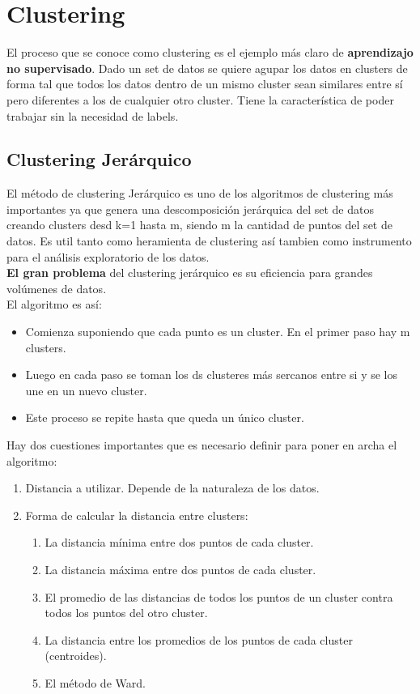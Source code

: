 \documentclass[titlepage,a4paper]{article}
\begin{document}
\section*{Clustering}
El proceso que se conoce como clustering es el ejemplo más claro de \textbf{aprendizajo no supervisado}. Dado un set de datos se quiere agupar los datos en clusters de forma tal que todos los datos dentro de un mismo cluster sean similares entre sí pero diferentes a los de cualquier otro cluster. Tiene la característica de poder trabajar sin la necesidad de labels. 

\subsection*{Clustering Jerárquico}
El método de clustering Jerárquico es uno de los algoritmos de clustering más importantes ya que genera una descomposición jerárquica del set de datos creando clusters desd k=1 hasta m, siendo m la cantidad de puntos del set de datos. Es util tanto como heramienta de clustering así tambien como instrumento para el análisis exploratorio de los datos. \\

\textbf{El gran problema} del clustering jerárquico es su eficiencia para grandes volúmenes de datos. \\

El algoritmo es así: 
\begin{itemize}
\item Comienza suponiendo que cada punto es un cluster. En el primer paso hay m clusters. 
\item Luego en cada paso se toman los ds clusteres más sercanos entre si y se los une en un nuevo cluster. 
\item Este proceso se repite hasta que queda un único cluster. 
\end{itemize}

Hay dos cuestiones importantes que es necesario definir para poner en archa el algoritmo: 
\begin{enumerate}
\item Distancia a utilizar. Depende de la naturaleza de los datos. 
\item Forma de calcular la distancia entre clusters:
\begin{enumerate}
\item La distancia mínima entre dos puntos de cada cluster. 
\item La distancia máxima entre dos puntos de cada cluster.
\item El promedio de las distancias de todos los puntos de un cluster contra todos los puntos del otro cluster. 
\item La distancia entre los promedios de los puntos de cada cluster (centroides). 
\item El método de Ward. 
\end{enumerate}
\end{enumerate}
\end{document}
